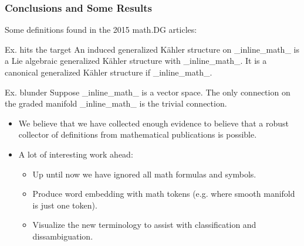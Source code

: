 \documentclass{beamer}
\begin{document}
\begin{frame} 
    \frametitle{Conclusions and Some Results}
    Some definitions found in the 2015 math.DG articles:
    \begin{block}{Ex. hits the target}
        {\small An {\color{blue}induced generalized Kähler structure} on \_inline\_math\_ is a Lie algebraic generalized Kähler structure with \_inline\_math\_. It is a canonical generalized Kähler structure if \_inline\_math\_.}
    \end{block}
    \begin{exampleblock}{Ex. blunder}
        Suppose \_inline\_math\_ is a {\color{green}vector space}. The only connection on the {\color{green}graded manifold} \_inline\_math\_ is the {\color{blue}trivial connection}.
    \end{exampleblock}
    \begin{itemize}
            \item We believe that we have collected enough evidence to believe that a robust collector of definitions from mathematical publications is possible.
            \item A lot of interesting work ahead:
                \begin{itemize}
                    \item Up until now we have ignored all math formulas and symbols.
                    \item Produce word embedding with math tokens (e.g. where smooth manifold is just one token).
                        \item Visualize the new terminology to assist with classification and dissambiguation.
                \end{itemize}
    \end{itemize}
\end{frame}
\begin{frame}
\titlepage
\end{frame}
\end{document}

